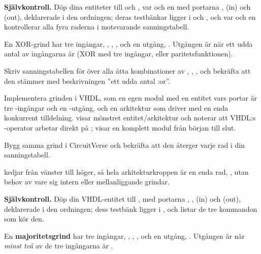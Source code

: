 
\begin{selfcheck}
\textbf{Självkontroll.} Döp dina entiteter till  och , var och en
med portarna ,  (in) och  (out), deklarerade i den ordningen; deras
testbänkar ligger i  och , och var och en
kontrollerar alla fyra raderna i motsvarande sanningstabell.
\end{selfcheck}

\label{c1:ex:xor3}
En XOR-grind har tre ingångar, , , , och en utgång, . Utgången är
 när ett udda antal av ingångarna är  (XOR med tre ingångar, eller
paritetsfunktionen).

 Skriv sanningstabellen för  över alla åtta kombinationer av , ,
, och bekräfta att den stämmer med beskrivningen ”ett udda antal :or”.

 Implementera grinden i VHDL, som en egen modul med en entitet vars portar är tre
-ingångar och en -utgång, och en arkitektur som driver 
med en enda konkurrent tilldelning.  visar mönstret entitet/arkitektur och
noterar att VHDL:s -operator arbetar direkt på ;
 visar en komplett modul från början till slut.

 Bygg samma grind i CircuitVerse och bekräfta att den återger varje rad i din
sanningstabell.

\note[Tips] kedjar från vänster till höger, så hela arkitekturkroppen är en enda rad,
, utan behov av vare sig intern  eller mellanliggande
grindar.


\begin{selfcheck}
\textbf{Självkontroll.} Döp din VHDL-entitet till , med portarna , ,
 (in) och  (out), deklarerade i den ordningen; dess testbänk ligger i
, och  listar de tre kommandon som kör den.
\end{selfcheck}

\label{c1:ex:majority3}
En \textbf{majoritetsgrind} har tre ingångar, , , , och en utgång,
. Utgången är  när \emph{minst två} av de tre ingångarna är .

